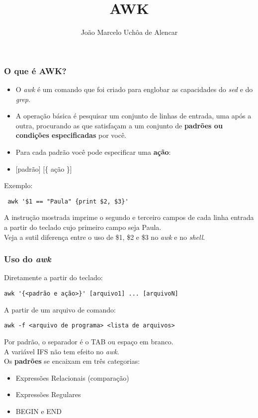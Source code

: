 \documentclass{beamer}
\title{AWK}
\author[João Marcelo Uchôa de Alencar]{João Marcelo Uchôa de Alencar}
\institute{Universidade Federal do Ceará - Quixadá}
\begin{document}
   \begin{frame}
      \titlepage
   \end{frame}

   \begin{frame}[fragile]
      \frametitle{O que é AWK?}
      \begin{itemize}
         \item O \textit{awk} é um comando que foi criado para englobar as capacidades do \textit{sed} e do \textit{grep}. \\
         \item A operação básica é pesquisar um conjunto de linhas de entrada, uma após a outra, procurando as que satisfaçam a um conjunto de \textbf{padrões ou condições especificadas} por você. \\
         \item Para cada padrão você pode especificar uma \textbf{ação}:\\
         \item $[$padrão$]$ $[$\{ ação \}$]$ \\
      \end{itemize}	 
      \begin{block}{Exemplo:}
      \begin{verbatim}
 awk '$1 == "Paula" {print $2, $3}' 
      \end{verbatim}
      \end{block}
      A instrução mostrada imprime o segundo e terceiro campos de cada linha entrada a partir do teclado cujo primeiro campo seja Paula. \\
      Veja a sutil diferença entre o uso de \$1, \$2 e \$3 no \textit{awk} e no \textit{shell}. \\
\end{frame}

   \begin{frame}[fragile]
      \frametitle{Uso do \textit{awk}}
      \begin{block}{Diretamente a partir do teclado:}
      \begin{verbatim}
awk '{<padrão e ação>}' [arquivo1] ... [arquivoN] 
      \end{verbatim}
      \end{block}
      \begin{block}{A partir de um arquivo de comando:}
      \begin{verbatim}
awk -f <arquivo de programa> <lista de arquivos> 
      \end{verbatim}
      \end{block}
      Por padrão, o separador é o TAB ou espaço em branco. \\
      A variável IFS não tem efeito no \textit{awk}. \\
      Os \textbf{padrões} se encaixam em três categorias:
      \begin{itemize}
         \item Expressões Relacionais (comparação)
	 \item Expressões Regulares
	 \item BEGIN e END
      \end{itemize}
\end{frame}
\end{document}

